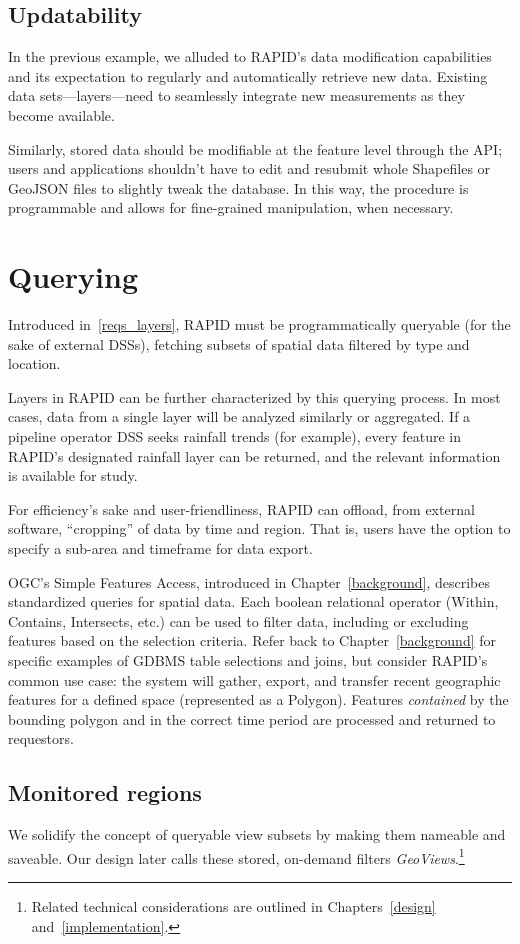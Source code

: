 \subsection{Updatability}
In the previous example, we alluded to RAPID's data modification capabilities and its expectation to regularly and automatically retrieve new data. Existing data sets---layers---need to seamlessly integrate new measurements as they become available.

Similarly, stored data should be modifiable at the feature level through the API; users and applications shouldn't have to edit and resubmit whole Shapefiles or GeoJSON files to slightly tweak the database. In this way, the procedure is programmable and allows for fine-grained manipulation, when necessary.

\section{Querying}

Introduced in~\ref{reqs_layers}, RAPID must be programmatically queryable (for the sake of external DSSs), fetching subsets of spatial data filtered by type and location.

Layers in RAPID can be further characterized by this querying process. In most cases, data from a single layer will be analyzed similarly or aggregated. If a pipeline operator DSS seeks rainfall trends (for example), every feature in RAPID's designated rainfall layer can be returned, and the relevant information is available for study.

For efficiency's sake and user-friendliness, RAPID can offload, from external software, ``cropping'' of data by time and region. That is, users have the option to specify a sub-area and timeframe for data export.

OGC's Simple Features Access, introduced in Chapter~\ref{background}, describes standardized queries for spatial data. Each boolean relational operator (Within, Contains, Intersects, etc.) can be used to filter data, including or excluding features based on the selection criteria. Refer back to Chapter~\ref{background} for specific examples of GDBMS table selections and joins, but consider RAPID's common use case: the system will gather, export, and transfer recent geographic features for a defined space (represented as a Polygon). Features \textit{contained} by the bounding polygon and in the correct time period are processed and returned to requestors.

\subsection{Monitored regions}
We solidify the concept of queryable view subsets by making them nameable and saveable. Our design later calls these stored, on-demand filters \textit{GeoViews}.\footnote{Related technical considerations are outlined in Chapters~\ref{design} and~\ref{implementation}.}

